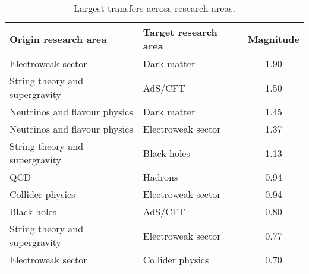 \begin{table}
\centering
\caption{Largest transfers across research areas.}
\label{table:largest_transfers}
\begin{tabular}{b{}|b{}|c}
\toprule
          Origin research area & Target research area & Magnitude \\ \hline
\midrule
            Electroweak sector &          Dark matter &      1.90 \\ \hline
String theory and supergravity &              AdS/CFT &      1.50 \\ \hline
 Neutrinos and flavour physics &          Dark matter &      1.45 \\ \hline
 Neutrinos and flavour physics &   Electroweak sector &      1.37 \\ \hline
String theory and supergravity &          Black holes &      1.13 \\ \hline
                           QCD &              Hadrons &      0.94 \\ \hline
              Collider physics &   Electroweak sector &      0.94 \\ \hline
                   Black holes &              AdS/CFT &      0.80 \\ \hline
String theory and supergravity &   Electroweak sector &      0.77 \\ \hline
            Electroweak sector &     Collider physics &      0.70 \\ \hline
\bottomrule
\end{tabular}
\end{table}
